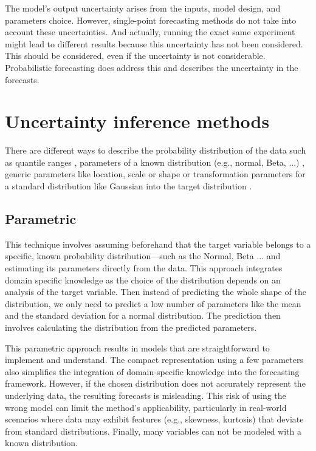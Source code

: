 \documentclass[12pt,a4paper]{book}
\begin{document}
The model's output uncertainty arises from the inputs, model design, and parameters choice. However, single-point forecasting methods do not take into account these uncertainties. And actually, running the exact same experiment might lead to different results because this uncertainty has not been considered. This should be considered, even if the uncertainty is not considerable. Probabilistic forecasting does address this and describes the uncertainty in the forecasts. 

\section{Uncertainty inference methods}
There are different ways to describe the probability distribution of the data such as quantile ranges \cite{chen_evaluating_2022}, parameters of a known distribution (e.g., normal, Beta, ...) \cite{fernandez-jimenez_short-term_2023}, generic parameters like location, scale or shape \citep{marz_xgboostlss_2019} or transformation parameters for a standard distribution like Gaussian into the target distribution \citep{rasul2021multivariate}.

\subsection{Parametric}
This technique \cite{fernandez-jimenez_short-term_2023} involves assuming beforehand that the target variable belongs to a specific, known probability distribution—such as the Normal, Beta ... and estimating its parameters directly from the data. This approach integrates domain specific knowledge as the choice of the distribution depends on an analysis of the target variable. 
Then instead of predicting the whole shape of the distribution, we only need to predict a low number of parameters like the mean and the standard deviation for a normal distribution.
The prediction then involves calculating the distribution from the predicted parameters.

This parametric approach results in models that are straightforward to implement and understand. The compact representation using a few parameters also simplifies the integration of domain-specific knowledge into the forecasting framework. However, if the chosen distribution does not accurately represent the underlying data, the resulting forecasts is misleading. This risk of using the wrong model can limit the method's applicability, particularly in real-world scenarios where data may exhibit features (e.g., skewness, kurtosis) that deviate from standard distributions. Finally, many variables can not be modeled with a known distribution.
\end{document}
